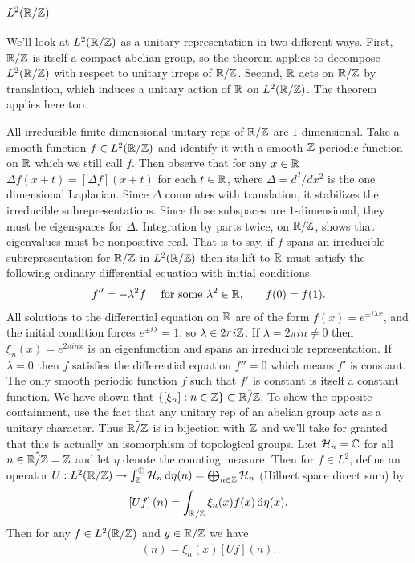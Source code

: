 \documentclass[11pt]{amsart}
\renewcommand{\H}{\mathcal{H}}
\begin{document}
\subsection{$L^{2}(\mathbb{R}/\mathbb{Z})$}
We'll look at $L^{2}(\mathbb{R}/\mathbb{Z})$ as a unitary representation in two different ways. First, $\mathbb{R}/\mathbb{Z}$ is itself a compact abelian group, so the theorem applies to decompose $L^{2}(\mathbb{R}/\mathbb{Z})$ with respect to unitary irreps of $\mathbb{R}/\mathbb{Z}$. Second, $\mathbb{R}$ acts on $\mathbb{R}/\mathbb{Z}$ by translation, which induces a unitary action of $\mathbb{R}$ on $L^{2}(\mathbb{R}/\mathbb{Z})$. The theorem applies here too.

\par All irreducible finite dimensional unitary reps of $\mathbb{R}/\mathbb{Z}$ are $1$ dimensional. Take a smooth function $f\in L^{2}(\mathbb{R}/\mathbb{Z})$ and identify it with a smooth $\mathbb{Z}$ periodic function on $\mathbb{R}$ which we still call $f$. Then observe that for any $x\in \mathbb{R}$ $\Delta f(x+t)=\left[\Delta f\right] (x+t)$ for each $t\in \mathbb{R}$, where $\Delta= d^{2}/dx^{2}$ is the one dimensional Laplacian. Since $\Delta$ commutes with translation, it stabilizes the irreducible subrepresentations. Since those subspaces are $1$-dimensional, they must be eigenspaces for $\Delta$. Integration by parts twice, on $\mathbb{R}/\mathbb{Z}$, shows that eigenvalues must be nonpositive real. That is to say, if $f$ spans an irreducible subrepresentation for $\mathbb{R}/\mathbb{Z}$ in $L^{2}(\mathbb{R}/\mathbb{Z})$ then its lift to $\mathbb{R}$ must satisfy the following ordinary differential equation with initial conditions 
	\begin{align*}
		f''=-\lambda^{2} f \quad \text{ for some $\lambda^{2} \in \mathbb{R}$,} \qquad f(0)=f(1).
	\end{align*}
All solutions to the differential equation on $\mathbb{R}$ are of the form $f(x)=e^{\pm i\lambda x}$, and the initial condition forces $e^{\pm i \lambda}=1$, so $\lambda \in 2\pi i \mathbb{Z}$. If $\lambda=2\pi i n \neq 0$ then $\xi_{n}(x)=e^{2\pi i n x}$ is an eigenfunction and spans an irreducible representation. If $\lambda = 0$ then $f$ satisfies the differential equation $f''=0$ which means $f'$ is constant. The only smooth periodic function $f$ such that $f'$ is constant is itself a constant function. We have shown that $\{ [\xi_{n}]: n\in \mathbb{Z}\} \subset \hat{\mathbb{R}/\mathbb{Z}}$. To show  the opposite containment, use the fact that any unitary rep of an abelian group acts as a unitary character. Thus $\hat{\mathbb{R}/\mathbb{Z}}$ is in bijection with $\mathbb{Z}$ and we'll take for granted that this is actually an isomorphism of topological groups. L:et $\H_{n}=\C$ for all $n\in \hat{\mathbb{R}/\mathbb{Z}}=\mathbb{Z}$  and let $\eta$ denote the counting measure. Then for $f\in L^{2}$, define an operator $U: L^{2}(\R/\Z)\to \int^{\oplus}_{\Z} \H_{n}\dop \eta (n)=\bigoplus_{n\in \Z} \H_{n}$ (Hilbert space direct sum) by
	\begin{align*}
		\left[Uf\right](n)=\int_{\mathbb{R}/\mathbb{Z}}\xi_{n}(x)f(x)\,{\rm d} \eta (x).
	\end{align*}
Then for any $f\in L^{2}(\mathbb{R}/\mathbb{Z})$ and $y\in \mathbb{R}/\mathbb{Z}$ we have
	\begin{align*}
		[U R_{y}f](n)=\xi_{n}(x)\left[Uf\right](n).
	\end{align*}
\end{document}
